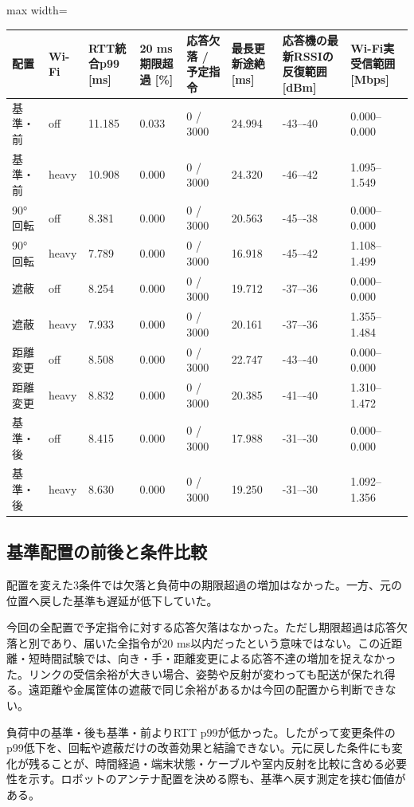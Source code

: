 \documentclass[a4paper,10pt]{ltjsarticle}
\begin{document}
\begin{center}\small\begin{adjustbox}{max width=\linewidth}
\begin{tabular}{llllllll}\toprule
配置 & Wi-Fi & RTT統合p99 [ms] & 20 ms期限超過 [\%] & 応答欠落 / 予定指令 & 最長更新途絶 [ms] & 応答機の最新RSSIの反復範囲 [dBm] & Wi-Fi実受信範囲 [Mbps]\\
\midrule
基準・前 & off & 11.185 & 0.033 & 0 / 3000 & 24.994 & -43–-40 & 0.000–0.000\\
基準・前 & heavy & 10.908 & 0.000 & 0 / 3000 & 24.320 & -46–-42 & 1.095–1.549\\
90°回転 & off & 8.381 & 0.000 & 0 / 3000 & 20.563 & -45–-38 & 0.000–0.000\\
90°回転 & heavy & 7.789 & 0.000 & 0 / 3000 & 16.918 & -45–-42 & 1.108–1.499\\
遮蔽 & off & 8.254 & 0.000 & 0 / 3000 & 19.712 & -37–-36 & 0.000–0.000\\
遮蔽 & heavy & 7.933 & 0.000 & 0 / 3000 & 20.161 & -37–-36 & 1.355–1.484\\
距離変更 & off & 8.508 & 0.000 & 0 / 3000 & 22.747 & -43–-40 & 0.000–0.000\\
距離変更 & heavy & 8.832 & 0.000 & 0 / 3000 & 20.385 & -41–-40 & 1.310–1.472\\
基準・後 & off & 8.415 & 0.000 & 0 / 3000 & 17.988 & -31–-30 & 0.000–0.000\\
基準・後 & heavy & 8.630 & 0.000 & 0 / 3000 & 19.250 & -31–-30 & 1.092–1.356\\
\bottomrule\end{tabular}\end{adjustbox}\end{center}

\subsection{基準配置の前後と条件比較}

配置を変えた3条件では欠落と負荷中の期限超過の増加はなかった。一方、元の位置へ戻した基準も遅延が低下していた。

今回の全配置で予定指令に対する応答欠落はなかった。ただし期限超過は応答欠落と別であり、届いた全指令が20 ms以内だったという意味ではない。この近距離・短時間試験では、向き・手・距離変更による応答不達の増加を捉えなかった。リンクの受信余裕が大きい場合、姿勢や反射が変わっても配送が保たれ得る。遠距離や金属筐体の遮蔽で同じ余裕があるかは今回の配置から判断できない。

負荷中の基準・後も基準・前よりRTT p99が低かった。したがって変更条件のp99低下を、回転や遮蔽だけの改善効果と結論できない。元に戻した条件にも変化が残ることが、時間経過・端末状態・ケーブルや室内反射を比較に含める必要性を示す。ロボットのアンテナ配置を決める際も、基準へ戻す測定を挟む価値がある。
\end{document}
